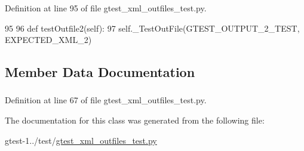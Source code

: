 \-Definition at line 95 of file gtest\-\_\-xml\-\_\-outfiles\-\_\-test.\-py.


\begin{DoxyCode}
95 
96   def testOutfile2(self):
97     self._TestOutFile(GTEST_OUTPUT_2_TEST, EXPECTED_XML_2)

\end{DoxyCode}


\subsection{\-Member \-Data \-Documentation}
\hypertarget{classgtest__xml__outfiles__test_1_1GTestXMLOutFilesTest_a5440e2d1179d4c71570162e9f6c1bd34}{
\subsubsection[{output\-\_\-dir\-\_\-}]{}}\label{d2/d60/classgtest__xml__outfiles__test_1_1GTestXMLOutFilesTest_a5440e2d1179d4c71570162e9f6c1bd34}


\-Definition at line 67 of file gtest\-\_\-xml\-\_\-outfiles\-\_\-test.\-py.



\-The documentation for this class was generated from the following file\-:\begin{DoxyCompactItemize}
\item 
gtest-\/1../test/\hyperlink{gtest__xml__outfiles__test_8py}{gtest\-\_\-xml\-\_\-outfiles\-\_\-test.\-py}\end{DoxyCompactItemize}
